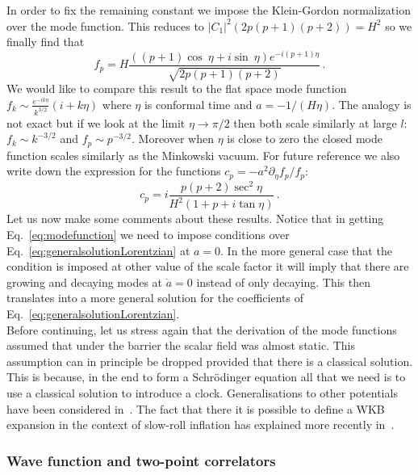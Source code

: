 \documentclass[a4paper,11pt]{article}
\numberwithin{equation}{section}
\numberwithin{equation}{section}
\begin{document}
In order to fix the remaining constant we impose the Klein-Gordon normalization over the mode function.
This reduces to $\vert C_1\vert^2(2p(p+1)(p+2))=H^2$ so we finally find that 
\begin{equation}
f_p=H \frac{((p+1)\cos\ \eta+i\sin\ \eta )e^{-i(p+1)\eta}}{\sqrt{2p(p+1)(p+2)}} \,. \label{eq:modefunction}
\end{equation}
We would like to compare this result to the flat space mode function $f_k\sim\frac{e^{-ik\eta}}{k^{3/2}}(i+k\eta)$ where $\eta$ is conformal time and $a=-1/(H\eta)$. The analogy  is not exact but if we look at the limit $\eta\to\pi/2$ then both scale similarly at large $l$: $f_k \sim k^{-3/2}$ and $f_p \sim p^{-3/2}$. Moreover when $\eta$ is close to zero the closed mode function scales similarly as the Minkowski vacuum. For future reference we also write down the expression for the functions $c_p = - a^2 \partial_\eta f_p/f_p$:
\begin{equation}
\label{eq:clL}
c_p = i \frac{p (p+2) \sec^2 \eta}{H^2 (1 + p + i \tan \eta)} \,.
\end{equation}
Let us now make some comments about these results. Notice that in getting Eq.~\eqref{eq:modefunction} we need to impose conditions over Eq.~\eqref{eq:generalsolutionLorentzian} at $a=0$. In the more general case that the condition is imposed at other value of the scale factor it will imply that there are growing and decaying modes at $\dot a=0$ instead of only decaying. This then translates into a more general solution for the coefficients of Eq.~\eqref{eq:generalsolutionLorentzian}.\\

Before continuing, let us stress again  that  the  derivation of the mode functions assumed that under the barrier the scalar field was almost static. This assumption can in principle  be dropped provided that there is a  classical solution. This is because, in the end to form a Schr\"odinger equation all that we need is to use a classical solution to introduce a clock. Generalisations to other potentials have been considered  in~\cite{Banks:1984np,Halliwell:1984eu}. The fact that there it is possible to define a WKB expansion in the context of slow-roll  inflation has  explained more recently in~\cite{Janssen:2020pii}.

\subsubsection*{Wave function and two-point correlators}
\end{document}
